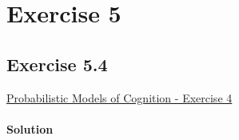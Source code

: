 \section*{Exercise 5}

\subsection*{Exercise 5.4}
\href{http://v1.probmods.org/conditioning.html#exercises}{Probabilistic Models of Cognition - Exercise 4}

\paragraph{Solution}

